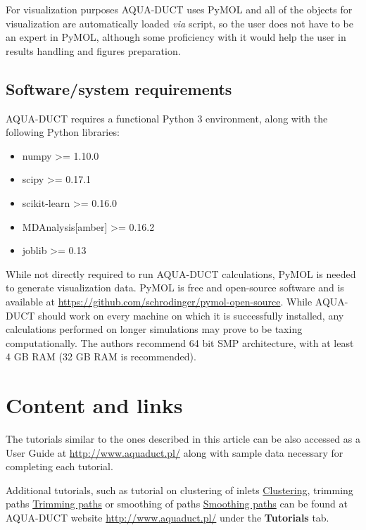 \documentclass[9pt,tutorial]{livecoms}
\begin{document}
For visualization purposes AQUA-DUCT uses PyMOL and all of the objects for visualization are automatically loaded \textit{via} script, so the user does not have to be an expert in PyMOL, although some proficiency with it would help the user in results handling and figures preparation.

\subsection{Software/system requirements}
AQUA-DUCT requires a functional Python 3 environment, along with the following Python libraries:
\begin{itemize}
    \item numpy >= 1.10.0
    \item scipy >= 0.17.1
    \item scikit-learn >= 0.16.0
    \item MDAnalysis[amber] >= 0.16.2
    \item joblib >= 0.13
\end{itemize}
While not directly required to run AQUA-DUCT calculations, PyMOL is needed to generate visualization data.
PyMOL is free and open-source software and is available at \url{https://github.com/schrodinger/pymol-open-source}.
While AQUA-DUCT should work on every machine on which it is successfully installed, any calculations performed on longer simulations may prove to be taxing computationally. The authors recommend 64 bit SMP architecture, with at least 4 GB RAM (32 GB RAM is recommended). 

\section{Content and links}

The tutorials similar to the ones described in this article can be also accessed as a User Guide at \href{http://www.aquaduct.pl/}{http://www.aquaduct.pl/} along with sample data necessary for completing each tutorial.

Additional tutorials, such as tutorial on clustering of inlets \href{http://www.aquaduct.pl/clustering/}{Clustering}, trimming paths \href{http://www.aquaduct.pl/trimming-paths/}{Trimming paths} or smoothing of paths \href{http://www.aquaduct.pl/smoothing-paths/}{Smoothing paths} can be found at AQUA-DUCT website \url{http://www.aquaduct.pl/} under the \textbf{Tutorials} tab.
\end{document}
